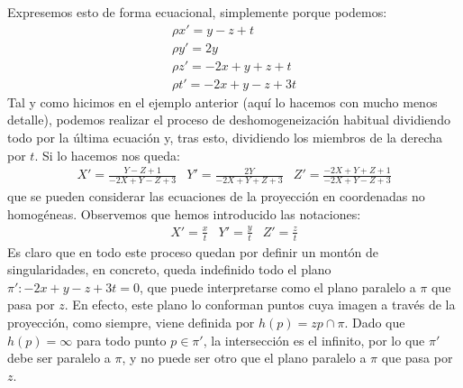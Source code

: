 \begin{exa}
	Expresemos esto de forma ecuacional, simplemente porque podemos:
	\[
	\begin{array}{l}
		\rho x'= y-z+t\\
		\rho y'= 2y\\
		\rho z'= -2x+y+z+t\\
		\rho t'= -2x+y-z+3t
	\end{array}
	\]
	Tal y como hicimos en el ejemplo anterior (aquí lo hacemos con mucho menos detalle), podemos realizar el proceso de deshomogeneización habitual dividiendo todo por la última ecuación y, tras esto, dividiendo los miembros de la derecha por $t$. Si lo hacemos nos queda:
	\[
	\begin{array}{ccc}
	X'=\frac{Y-Z+1}{-2X+Y-Z+3} &
	Y'=\frac{2Y}{-2X+Y+Z+3} &
	Z'=\frac{-2X+Y+Z+1}{-2X+Y-Z+3}
	\end{array}
	\]
	que se pueden considerar las ecuaciones de la proyección en coordenadas no homogéneas. Observemos que hemos introducido las notaciones:
	\[\begin{array}{ccc}
	X'=\frac{x}{t} & Y'=\frac{y}{t} & Z'=\frac{z}{t}
	\end{array}\]
	Es claro que en todo este proceso quedan por definir un montón de singularidades, en concreto, queda indefinido todo el plano $\pi':-2x+y-z+3t=0$, que puede interpretarse como el plano paralelo a $\pi$ que pasa por $z$. En efecto, este plano lo conforman puntos cuya imagen a través de la proyección, como siempre, viene definida por $h(p)=zp\cap \pi$. Dado que $h(p)=\infty$ para todo punto $p\in\pi'$, la intersección es el infinito, por lo que $\pi'$ debe ser paralelo a $\pi$, y no puede ser otro que el plano paralelo a $\pi$ que pasa por $z$.
\end{exa}